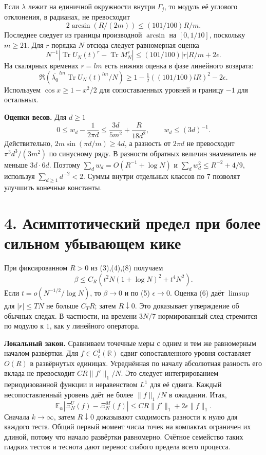 \documentclass[11pt,a4paper]{article}
\newcommand{\Tr}{\operatorname{Tr}}
\newcommand{\EE}{\mathbb E}
\newcommand{\R}{\mathbb R}
\newcommand{\sect}[1]{\section*{\sffamily\color{ink}#1}}
\newcommand{\subt}[1]{\par\medskip\noindent\textbf{#1.}\quad}
\begin{document}
Если \(\lambda\) лежит на единичной окружности внутри \(\Gamma_j\), то модуль её углового отклонения, в радианах, не превосходит
\[
                  2\arcsin(R/(2m))\le (101/100)R/m .
\]
Последнее следует из границы производной \(\arcsin\) на \([0,1/10]\), поскольку \(m\ge21\). Для \(r\) порядка \(N\) отсюда следует равномерная оценка
\[
        N^{-1}|\Tr U_N(t)^r-\Tr M_N^r|
                      \le (101/100)|r|R/m+2\epsilon .           \tag{6}
\]
На скалярных временах \(r=l m\) есть нижняя оценка в фазе линейного возврата:
\begin{equation}
      \Re\left(\overline{\lambda_0}^{\,l m}\Tr U_N(t)^{l m}/N\right)
                  \ge 1-\tfrac12((101/100)lR)^2-2\epsilon .     \tag{7}
\end{equation}
Используем \(\cos x\ge1-x^2/2\) для сопоставленных уровней и границу \(-1\) для остальных.

\subt{Оценки весов}
Для \(d\ge1\)
\begin{equation}
 0\le w_d-\frac1{2\pi d}
      \le \frac{3d}{5m^2}+\frac{R}{18d^2},\qquad
                      w_d\le (3d)^{-1}.                        \tag{8}
\end{equation}
Действительно, \(2m\sin(\pi d/m)\ge4d\), а разность от \(2\pi d\) не превосходит \(\pi^3d^3/(3m^2)\) по синусному ряду. В разности обратных величин знаменатель не меньше \(3d\cdot6d\). Поэтому \(\sum_d w_d=O(R^{-1}+\log N)\) и \(\sum_d w_d^2\le R^{-2}+4/9\), используя \(\sum_{d\ge1}d^{-2}<2\). Суммы внутри отдельных классов по \(7\) позволят улучшить конечные константы.
\newpage
\sect{4. Асимптотический предел при более сильном убывающем кике}
При фиксированном \(R>0\) из (3),(4),(8) получаем
\begin{equation}
             \beta\le C_R\left(t^2N(1+\log N)^2+t^4N^2\right).
                                                             \tag{9}
\end{equation}
Если \(t=o(N^{-1/2}/\log N)\), то \(\beta\to0\) и по (5) \(\epsilon\to0\). Оценка (6) даёт \(\limsup\) для \(|r|\le TN\) не больше \(C_T R\); затем \(R\downarrow0\). Это доказывает утверждение об обычных следах. В частности, на времени \(3N/7\) нормированный след стремится по модулю к \(1\), как у линейного оператора.

\subt{Локальный закон}
Сравниваем точечные меры с одним и тем же равномерным началом развёртки. Для \(f\in C_c^1(\R)\) сдвиг сопоставленного уровня составляет \(O(R)\) в развёрнутых единицах. Усреднённая по началу абсолютная разность его вклада не превосходит \(C R\|f'\|_1/N\). Это следует интегрированием периодизованной функции и неравенством \(L^1\) для её сдвига. Каждый несопоставленный уровень даёт не более \(\|f\|_1/N\) в ожидании. Итак,
\[
       \EE_\alpha|\Xi_N^{U}(f)-\Xi_N^{M}(f)|
                             \le C R\|f'\|_1+2\epsilon\|f\|_1.
\]
Сначала \(k\to\infty\), затем \(R\downarrow0\) доказывают сходимость разности к нулю для каждого теста. Общий первый момент числа точек на компактах ограничен их длиной, потому что начало развёртки равномерно. Счётное семейство таких гладких тестов и теснота дают перенос слабого предела всего процесса.
\end{document}
